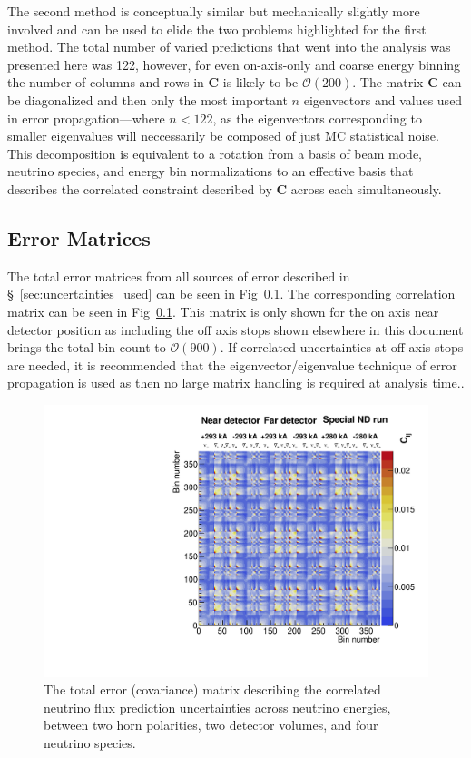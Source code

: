 \documentclass{article}
\begin{document}
The second method is conceptually similar but mechanically slightly more involved and can be used to elide the two problems highlighted for the first method. The total number of varied predictions that went into the analysis was presented here was 122, however, for even on-axis-only and coarse energy binning the number of columns and rows in $\mathbf{C}$ is likely to be $\mathcal{O}\left(200\right)$. The matrix $\mathbf{C}$ can be diagonalized and then only the most important $n$ eigenvectors and values used in error propagation---where $n<122$, as the eigenvectors corresponding to smaller eigenvalues will neccessarily be composed of just MC statistical noise. This decomposition is equivalent to a rotation from a basis of beam mode, neutrino species, and energy bin normalizations to an effective basis that describes the correlated constraint described by $\mathbf{C}$ across each simultaneously.

\subsection{Error Matrices}

The total error matrices from all sources of error described in \S~\ref{sec:uncertainties_used} can be seen in Fig~\ref{}. The corresponding correlation matrix can be seen in Fig~\ref{}. This matrix is only shown for the on axis near detector position as including the off axis stops shown elsewhere in this document brings the total bin count to $\mathcal{O}\left(900\right)$. If correlated uncertainties at off axis stops are needed, it is recommended that the eigenvector/eigenvalue technique of error propagation is used as then no large matrix handling is required at analysis time..

\begin{figure}
  \includegraphics[width=\textwidth]{plots/mats/ErrorMatrices_covmat}
  \caption{The total error (covariance) matrix describing the correlated neutrino flux prediction uncertainties across neutrino energies, between two horn polarities, two detector volumes, and four neutrino species.}
  \label{fig:covmat}
\end{figure}
\end{document}
